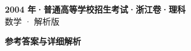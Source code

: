 \documentclass[zihao=-4, a4paper]{ctexart}
\begin{document}
\begin{center}
  {\Large\bfseries 2004 年·普通高等学校招生考试·浙江卷·理科}\\[4pt]
  {\large 数学 · 解析版}
\end{center}
\medskip
{}

\clearpage
{}
\begin{center}{\Large\bfseries 参考答案与详细解析}\end{center}
\medskip

\end{document}
